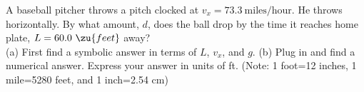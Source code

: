 A baseball pitcher throws a pitch clocked at $v_x=73.3\ \text{miles/hour}$.
He throws horizontally. By what amount, $d$, does the
ball drop by the time it reaches home plate, $L=60.0\ \zu{feet}$ away?\\
%
        (a) First find a symbolic answer in terms of $L$, $v_x$, and $g$.\answercheck\hwendpart
%
        (b) Plug in and find a numerical answer. Express your
        answer in units of ft. (Note: 1 foot=12 inches, 1 mile=5280 feet, and
        1 inch=2.54 cm) \answercheck
